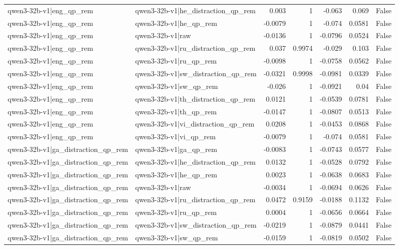 \begin{table}
\begin{tabular}{l l r r r r l}
qwen3-32b-v1|eng_qp_rem & qwen3-32b-v1|he_distraction_qp_rem & 0.003 & 1 & -0.063 & 0.069 & False \\
qwen3-32b-v1|eng_qp_rem & qwen3-32b-v1|he_qp_rem & -0.0079 & 1 & -0.074 & 0.0581 & False \\
qwen3-32b-v1|eng_qp_rem & qwen3-32b-v1|raw & -0.0136 & 1 & -0.0796 & 0.0524 & False \\
qwen3-32b-v1|eng_qp_rem & qwen3-32b-v1|ru_distraction_qp_rem & 0.037 & 0.9974 & -0.029 & 0.103 & False \\
qwen3-32b-v1|eng_qp_rem & qwen3-32b-v1|ru_qp_rem & -0.0098 & 1 & -0.0758 & 0.0562 & False \\
qwen3-32b-v1|eng_qp_rem & qwen3-32b-v1|sw_distraction_qp_rem & -0.0321 & 0.9998 & -0.0981 & 0.0339 & False \\
qwen3-32b-v1|eng_qp_rem & qwen3-32b-v1|sw_qp_rem & -0.026 & 1 & -0.0921 & 0.04 & False \\
qwen3-32b-v1|eng_qp_rem & qwen3-32b-v1|th_distraction_qp_rem & 0.0121 & 1 & -0.0539 & 0.0781 & False \\
qwen3-32b-v1|eng_qp_rem & qwen3-32b-v1|th_qp_rem & -0.0147 & 1 & -0.0807 & 0.0513 & False \\
qwen3-32b-v1|eng_qp_rem & qwen3-32b-v1|vi_distraction_qp_rem & 0.0208 & 1 & -0.0453 & 0.0868 & False \\
qwen3-32b-v1|eng_qp_rem & qwen3-32b-v1|vi_qp_rem & -0.0079 & 1 & -0.074 & 0.0581 & False \\
qwen3-32b-v1|ga_distraction_qp_rem & qwen3-32b-v1|ga_qp_rem & -0.0083 & 1 & -0.0743 & 0.0577 & False \\
qwen3-32b-v1|ga_distraction_qp_rem & qwen3-32b-v1|he_distraction_qp_rem & 0.0132 & 1 & -0.0528 & 0.0792 & False \\
qwen3-32b-v1|ga_distraction_qp_rem & qwen3-32b-v1|he_qp_rem & 0.0023 & 1 & -0.0638 & 0.0683 & False \\
qwen3-32b-v1|ga_distraction_qp_rem & qwen3-32b-v1|raw & -0.0034 & 1 & -0.0694 & 0.0626 & False \\
qwen3-32b-v1|ga_distraction_qp_rem & qwen3-32b-v1|ru_distraction_qp_rem & 0.0472 & 0.9159 & -0.0188 & 0.1132 & False \\
qwen3-32b-v1|ga_distraction_qp_rem & qwen3-32b-v1|ru_qp_rem & 0.0004 & 1 & -0.0656 & 0.0664 & False \\
qwen3-32b-v1|ga_distraction_qp_rem & qwen3-32b-v1|sw_distraction_qp_rem & -0.0219 & 1 & -0.0879 & 0.0441 & False \\
qwen3-32b-v1|ga_distraction_qp_rem & qwen3-32b-v1|sw_qp_rem & -0.0159 & 1 & -0.0819 & 0.0502 & False \\

\end{tabular}
\end{table}
